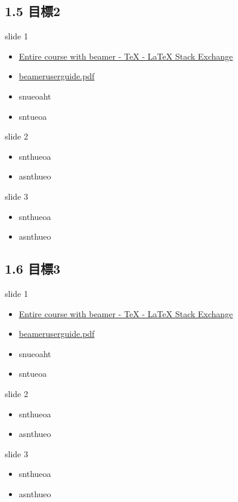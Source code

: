 \documentclass[t]{beamer}
\begin{document}
\subsection{1.5 目標2}
\label{sec-1-2-2}
\begin{frame}[label=sec-1-2-2-1]{slide 1}
\begin{itemize}
\item \href{http://tex.stackexchange.com/questions/52900/entire-course-with-beamer}{Entire course with beamer - \TeX{} - \LaTeX{} Stack Exchange}
\item \href{http://ctan.megagod.net/tex-archive/macros/latex/contrib/beamer/doc/beameruserguide.pdf}{beameruserguide.pdf}
\item snueoaht
\item sntueoa
\end{itemize}
\end{frame}
\begin{frame}[label=sec-1-2-2-2]{slide 2}
\begin{itemize}
\item snthueoa
\item asnthueo
\end{itemize}
\end{frame}
\begin{frame}[label=sec-1-2-2-3]{slide 3}
\begin{itemize}
\item snthueoa
\item asnthueo
\end{itemize}
\end{frame}
\subsection{1.6 目標3}
\label{sec-1-2-3}
\begin{frame}[label=sec-1-2-3-1]{slide 1}
\begin{itemize}
\item \href{http://tex.stackexchange.com/questions/52900/entire-course-with-beamer}{Entire course with beamer - \TeX{} - \LaTeX{} Stack Exchange}
\item \href{http://ctan.megagod.net/tex-archive/macros/latex/contrib/beamer/doc/beameruserguide.pdf}{beameruserguide.pdf}
\item snueoaht
\item sntueoa
\end{itemize}
\end{frame}
\begin{frame}[label=sec-1-2-3-2]{slide 2}
\begin{itemize}
\item snthueoa
\item asnthueo
\end{itemize}
\end{frame}
\begin{frame}[label=sec-1-2-3-3]{slide 3}
\begin{itemize}
\item snthueoa
\item asnthueo
\end{itemize}
\end{frame}
\end{document}
